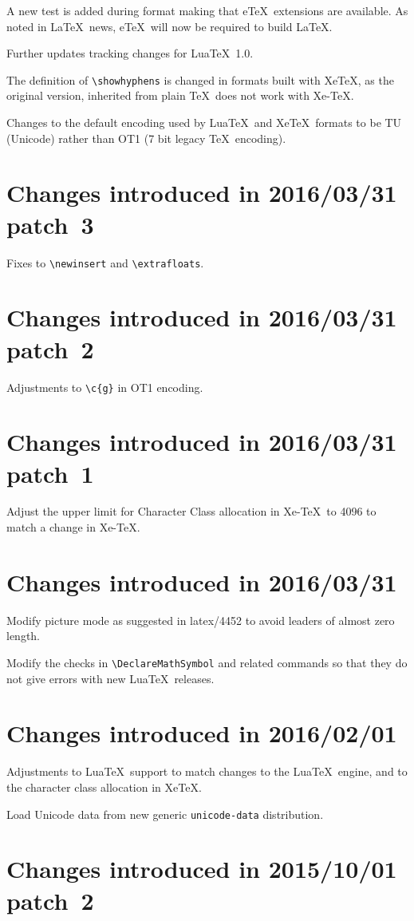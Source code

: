 \documentclass{ltxguide}
\begin{document}
A new test is added during format making that e\TeX\ extensions are
available. As noted in \LaTeX\ news, e\TeX\ will now be required to
build \LaTeX.
 
Further updates tracking changes for Lua\TeX~1.0.

The definition of \verb|\showhyphens| is changed in formats built
with Xe\TeX, as the original version, inherited from plain \TeX\ does
not work with Xe-\TeX.

Changes to the default encoding used by Lua\TeX\ and Xe\TeX\ formats to
be TU (Unicode) rather than OT1 (7 bit legacy \TeX\ encoding).

\section{Changes  introduced in 2016/03/31 patch~3}
Fixes to \verb|\newinsert| and \verb|\extrafloats|.

\section{Changes  introduced in 2016/03/31 patch~2}
Adjustments to \verb|\c{g}| in OT1 encoding.

\section{Changes  introduced in 2016/03/31 patch~1}
Adjust the upper limit for Character Class allocation in Xe-\TeX\ to
4096 to match a change in Xe-\TeX.

\section{Changes  introduced in 2016/03/31}
Modify picture mode as suggested in latex/4452 to avoid leaders of
almost zero length.

Modify the checks in \verb|\DeclareMathSymbol| and related commands
so that they do not give errors with new Lua\TeX\ releases.

\section{Changes  introduced in 2016/02/01}
Adjustments to Lua\TeX\ support to match changes to the Lua\TeX\ engine,
and to the character class allocation in Xe\TeX.

Load Unicode data from new generic \texttt{unicode-data} distribution.

\section{Changes  introduced in 2015/10/01 patch~2}
\end{document}
